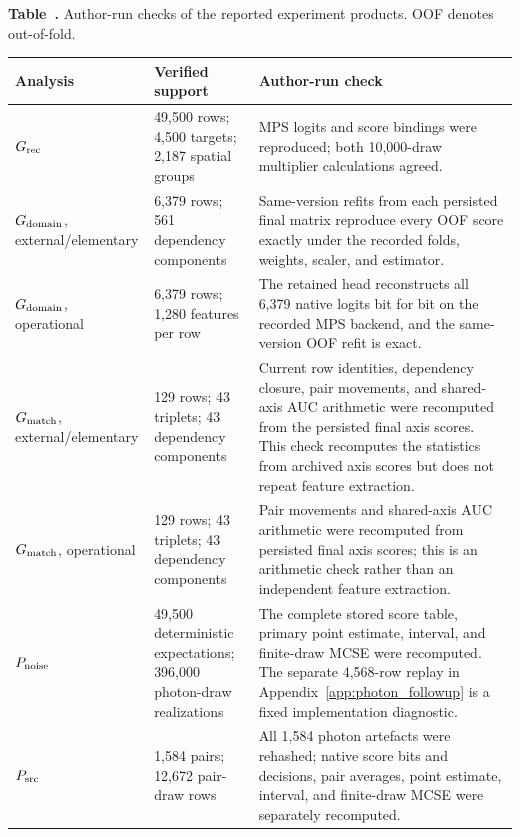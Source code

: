 \begin{table}
\label{tab:independent_checks}
\noindent\textbf{Table~\thetable.} Author-run checks of the reported
experiment products. OOF denotes out-of-fold.
\begin{center}
\small
\begin{tabular}{L{0.13\textwidth}L{0.22\textwidth}L{0.58\textwidth}}
\toprule
Analysis & Verified support & Author-run check \\
\midrule
\(G_{\rm rec}\) &
49,500 rows; 4,500 targets; 2,187 spatial groups &
MPS logits and score bindings were reproduced; both 10,000-draw multiplier
calculations agreed. \\
\(G_{\rm domain}\), external/elementary &
6,379 rows; 561 dependency components &
Same-version refits from each persisted final matrix reproduce every OOF
score exactly under the recorded folds, weights, scaler, and estimator. \\
\(G_{\rm domain}\), operational &
6,379 rows; 1,280 features per row &
The retained head reconstructs all 6,379 native logits bit for bit on the
recorded MPS backend, and the same-version OOF refit is exact. \\
\(G_{\rm match}\), external/elementary &
129 rows; 43 triplets; 43 dependency components &
Current row identities, dependency closure, pair movements, and shared-axis
AUC arithmetic were recomputed from the persisted final axis scores. This
check recomputes the statistics from archived axis scores but does not repeat
feature extraction. \\
\(G_{\rm match}\), operational &
129 rows; 43 triplets; 43 dependency components &
Pair movements and shared-axis AUC arithmetic were recomputed from persisted
final axis scores; this is an arithmetic check rather than an independent
feature extraction. \\
\(P_{\rm noise}\) &
49,500 deterministic expectations; 396,000 photon-draw realizations &
The complete stored score table, primary point estimate, interval, and
finite-draw MCSE were recomputed. The separate 4,568-row replay in
Appendix~\ref{app:photon_followup} is a fixed implementation diagnostic. \\
\(P_{\rm src}\) &
1,584 pairs; 12,672 pair-draw rows &
All 1,584 photon artefacts were rehashed; native score bits and decisions,
pair averages, point estimate, interval, and finite-draw MCSE were separately
recomputed. \\
\bottomrule
\end{tabular}
\end{center}
\end{table}

